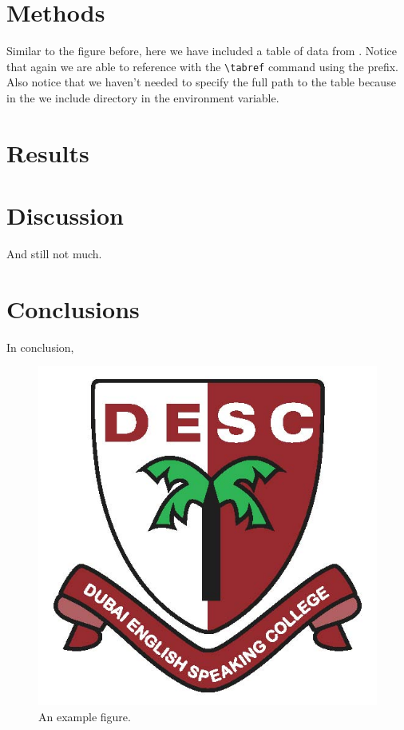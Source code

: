 \documentclass[]{emulateapj}
\begin{document}
\section{Methods}
\label{sec:methods}

Similar to the figure before, here we have included a table of data from .  Notice that again we are able to reference  with the \verb=\tabref= command using the  prefix. Also notice that we haven't needed to specify the full path to the table because in the  we include  directory in the  environment variable.



\section{Results}
\label{sec:results}


\section{Discussion}
\label{sec:discussion}

And still not much.

\section{Conclusions}
\label{sec:conclusions}

In conclusion, 

\begin{figure}[h]
\includegraphics[width=\columnwidth]{example.jpg}
\caption{An example figure. \label{fig:example}}
\end{figure}





\end{document}
